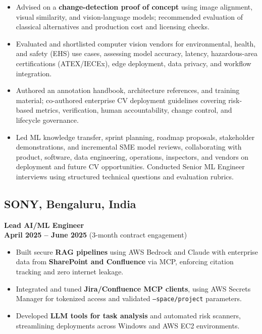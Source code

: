 \documentclass[a4paper,10pt]{article}
\begin{document}
\begin{itemize}
	\item Advised on a \textbf{change-detection proof of concept} using image alignment, visual similarity, and vision-language models; recommended evaluation of classical alternatives and production cost and licensing checks.

	\item Evaluated and shortlisted computer vision vendors for environmental, health, and safety (EHS) use cases, assessing model accuracy, latency, hazardous-area certifications (ATEX/IECEx), edge deployment, data privacy, and workflow integration.

	\item Authored an annotation handbook, architecture references, and training material; co-authored enterprise CV deployment guidelines covering risk-based metrics, verification, human accountability, change control, and lifecycle governance.

	\item Led ML knowledge transfer, sprint planning, roadmap proposals, stakeholder demonstrations, and incremental SME model reviews, collaborating with product, software, data engineering, operations, inspectors, and vendors on deployment and future CV opportunities. Conducted Senior ML Engineer interviews using structured technical questions and evaluation rubrics.
\end{itemize}	
	
	
\subsection{SONY, Bengaluru, India}
\textbf{Lead AI/ML Engineer} \\
\hfill \textbf{April 2025 -- June 2025} (3-month contract engagement)
\begin{itemize}
	\item Built secure \textbf{RAG pipelines} using AWS Bedrock and Claude with enterprise data from \textbf{SharePoint and Confluence} via MCP, enforcing citation tracking and zero internet leakage.
	\item Integrated and tuned \textbf{Jira/Confluence MCP clients}, using AWS Secrets Manager for tokenized access and validated \texttt{--space/project} parameters.
	\item Developed \textbf{LLM tools for task analysis} and automated risk scanners, streamlining deployments across Windows and AWS EC2 environments.
\end{itemize}	
	
	
\end{document}
